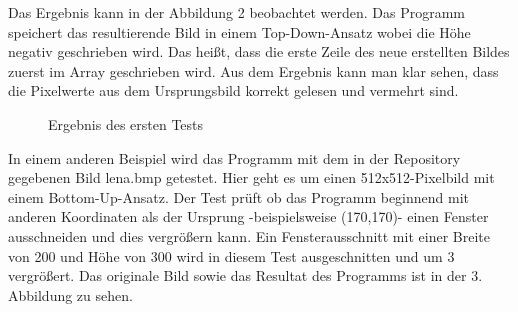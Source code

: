 \documentclass[course=erap]{aspdoc}
\begin{document}
    Das Ergebnis kann in der Abbildung 2 beobachtet werden. Das Programm speichert das resultierende Bild
    in einem Top-Down-Ansatz wobei die Höhe negativ geschrieben wird. Das heißt, dass die erste Zeile des neue erstellten Bildes zuerst im Array geschrieben wird.
    Aus dem Ergebnis kann man klar sehen, dass die Pixelwerte aus dem Ursprungsbild korrekt gelesen und vermehrt sind.

    \begin{figure}[ht]%
        \centering
        \qquad
        \caption{Ergebnis des ersten Tests}%
        \label{fig:enter-label1}
    \end{figure}

    In einem anderen Beispiel wird das Programm mit dem in der Repository gegebenen Bild lena.bmp getestet.
    Hier geht es um einen 512x512-Pixelbild mit einem Bottom-Up-Ansatz. Der Test prüft ob das Programm beginnend
    mit anderen Koordinaten als der Ursprung -beispielsweise (170,170)- einen Fenster ausschneiden und dies vergrößern
    kann. Ein Fensterausschnitt mit einer Breite von 200 und Höhe von 300 wird in diesem Test ausgeschnitten und um 3
    vergrößert. Das originale Bild sowie das Resultat des Programms ist in der 3. Abbildung zu sehen.
\end{document}
